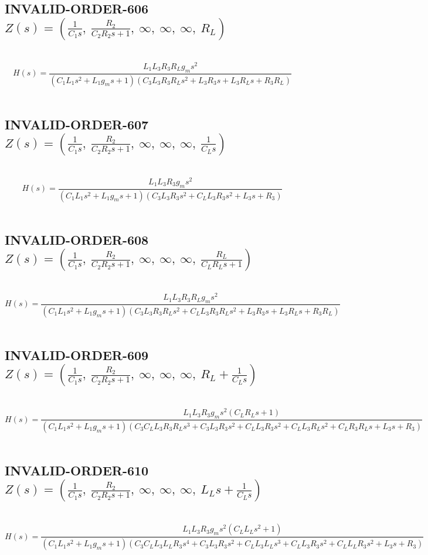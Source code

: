 \documentclass{article}
\begin{document}
\subsection{INVALID-ORDER-606 $Z(s) = \left( \frac{1}{C_{1} s}, \  \frac{R_{2}}{C_{2} R_{2} s + 1}, \  \infty, \  \infty, \  \infty, \  R_{L}\right)$ } \ 
\textbf{\[H(s) = \frac{L_{1} L_{3} R_{3} R_{L} g_{m} s^{2}}{\left(C_{1} L_{1} s^{2} + L_{1} g_{m} s + 1\right) \left(C_{3} L_{3} R_{3} R_{L} s^{2} + L_{3} R_{3} s + L_{3} R_{L} s + R_{3} R_{L}\right)}\] } \ 
\subsection{INVALID-ORDER-607 $Z(s) = \left( \frac{1}{C_{1} s}, \  \frac{R_{2}}{C_{2} R_{2} s + 1}, \  \infty, \  \infty, \  \infty, \  \frac{1}{C_{L} s}\right)$ } \ 
\textbf{\[H(s) = \frac{L_{1} L_{3} R_{3} g_{m} s^{2}}{\left(C_{1} L_{1} s^{2} + L_{1} g_{m} s + 1\right) \left(C_{3} L_{3} R_{3} s^{2} + C_{L} L_{3} R_{3} s^{2} + L_{3} s + R_{3}\right)}\] } \ 
\subsection{INVALID-ORDER-608 $Z(s) = \left( \frac{1}{C_{1} s}, \  \frac{R_{2}}{C_{2} R_{2} s + 1}, \  \infty, \  \infty, \  \infty, \  \frac{R_{L}}{C_{L} R_{L} s + 1}\right)$ } \ 
\textbf{\[H(s) = \frac{L_{1} L_{3} R_{3} R_{L} g_{m} s^{2}}{\left(C_{1} L_{1} s^{2} + L_{1} g_{m} s + 1\right) \left(C_{3} L_{3} R_{3} R_{L} s^{2} + C_{L} L_{3} R_{3} R_{L} s^{2} + L_{3} R_{3} s + L_{3} R_{L} s + R_{3} R_{L}\right)}\] } \ 
\subsection{INVALID-ORDER-609 $Z(s) = \left( \frac{1}{C_{1} s}, \  \frac{R_{2}}{C_{2} R_{2} s + 1}, \  \infty, \  \infty, \  \infty, \  R_{L} + \frac{1}{C_{L} s}\right)$ } \ 
\textbf{\[H(s) = \frac{L_{1} L_{3} R_{3} g_{m} s^{2} \left(C_{L} R_{L} s + 1\right)}{\left(C_{1} L_{1} s^{2} + L_{1} g_{m} s + 1\right) \left(C_{3} C_{L} L_{3} R_{3} R_{L} s^{3} + C_{3} L_{3} R_{3} s^{2} + C_{L} L_{3} R_{3} s^{2} + C_{L} L_{3} R_{L} s^{2} + C_{L} R_{3} R_{L} s + L_{3} s + R_{3}\right)}\] } \ 
\subsection{INVALID-ORDER-610 $Z(s) = \left( \frac{1}{C_{1} s}, \  \frac{R_{2}}{C_{2} R_{2} s + 1}, \  \infty, \  \infty, \  \infty, \  L_{L} s + \frac{1}{C_{L} s}\right)$ } \ 
\textbf{\[H(s) = \frac{L_{1} L_{3} R_{3} g_{m} s^{2} \left(C_{L} L_{L} s^{2} + 1\right)}{\left(C_{1} L_{1} s^{2} + L_{1} g_{m} s + 1\right) \left(C_{3} C_{L} L_{3} L_{L} R_{3} s^{4} + C_{3} L_{3} R_{3} s^{2} + C_{L} L_{3} L_{L} s^{3} + C_{L} L_{3} R_{3} s^{2} + C_{L} L_{L} R_{3} s^{2} + L_{3} s + R_{3}\right)}\] } \ 
\end{document}
